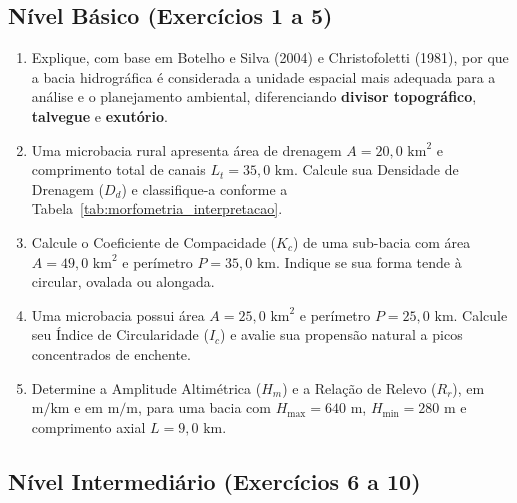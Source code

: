 
\subsection*{Nível Básico (Exercícios 1 a 5)}

\begin{enumerate}[leftmargin=1.8em, itemsep=4pt]
  \item Explique, com base em Botelho e Silva (2004) e Christofoletti (1981), por que a bacia hidrográfica é considerada a unidade espacial mais adequada para a análise e o planejamento ambiental, diferenciando \textbf{divisor topográfico}, \textbf{talvegue} e \textbf{exutório}.
  \espacoResolucao[2.0cm]

  \item Uma microbacia rural apresenta área de drenagem $A = 20{,}0\text{ km}^2$ e comprimento total de canais $L_t = 35{,}0\text{ km}$. Calcule sua Densidade de Drenagem ($D_d$) e classifique-a conforme a Tabela~\ref{tab:morfometria_interpretacao}.
  \espacoResolucao[1.8cm]

  \item Calcule o Coeficiente de Compacidade ($K_c$) de uma sub-bacia com área $A = 49{,}0\text{ km}^2$ e perímetro $P = 35{,}0\text{ km}$. Indique se sua forma tende à circular, ovalada ou alongada.
  \espacoResolucao[1.8cm]

  \item Uma microbacia possui área $A = 25{,}0\text{ km}^2$ e perímetro $P = 25{,}0\text{ km}$. Calcule seu Índice de Circularidade ($I_c$) e avalie sua propensão natural a picos concentrados de enchente.
  \espacoResolucao[1.8cm]

  \item Determine a Amplitude Altimétrica ($H_m$) e a Relação de Relevo ($R_r$), em $\text{m}/\text{km}$ e em $\text{m}/\text{m}$, para uma bacia com $H_{\max} = 640\text{ m}$, $H_{\min} = 280\text{ m}$ e comprimento axial $L = 9{,}0\text{ km}$.
  \espacoResolucao[1.8cm]
\end{enumerate}

\subsection*{Nível Intermediário (Exercícios 6 a 10)}

